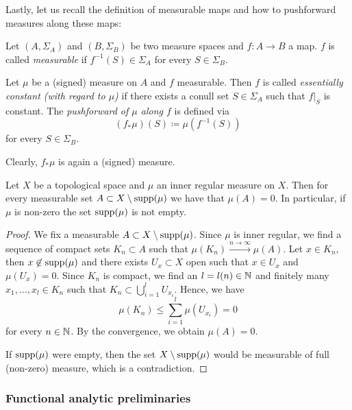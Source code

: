 Lastly, let us recall the definition of measurable maps and how to pushforward measures along these maps:

\begin{defin}
  \label{defin:pushforward}
  Let \((A, \Sigma_A)\) and \((B, \Sigma_B)\) be two measure spaces and \(f\colon A \to B\) a map. \(f\) is called \emph{measurable} if \(f^{-1}(S) \in \Sigma_A\) for every \(S \in \Sigma_B\).

  Let \(\mu\) be a (signed) measure on \(A\) and \(f\) measurable. Then \(f\) is called \emph{essentially constant (with regard to \(\mu\))} if there exists a conull set \(S \in \Sigma_A\) such that \(f|_S\) is constant. The \emph{pushforward of \(\mu\) along \(f\)} is defined via
  \[
    (f_\ast \mu)(S) \coloneqq \mu(f^{-1}(S))
  \]
  for every \(S \in \Sigma_B\).
\end{defin}

\begin{rem}
  Clearly, \(f_\ast\mu\) is again a (signed) measure.
\end{rem}

\begin{lemma}
  \label{lem:mu-supp}
  Let \(X\) be a topological space and \(\mu\) an inner regular measure on \(X\). Then for every measurable set \(A \subset X \setminus \operatorname{supp}(\mu)\) we have that \(\mu(A) = 0\). In particular, if \(\mu\) is non-zero the set \(\operatorname{supp}(\mu)\) is not empty.
\end{lemma}

\begin{proof}
  We fix a measurable \(A \subset X \setminus \operatorname{supp}(\mu)\). Since \(\mu\) is inner regular, we find a sequence of compact sets \(K_n \subset A\) such that \(\mu(K_n) \xrightarrow{n \to \infty} \mu(A)\). Let \(x \in K_n\), then \(x \not \in \operatorname{supp}(\mu)\) and there exists \(U_x \subset X\) open such that \(x \in U_x\) and \(\mu(U_x) = 0\). Since \(K_n\) is compact, we find an \(l = l(n) \in \mathbb{N}\) and finitely many \(x_1, \dots, x_l \in K_n\) such that \(K_n \subset \bigcup_{i=1}^l U_{x_i}\). Hence, we have
  \[
    \mu(K_n) \leq \sum_{i=1}^l \mu(U_{x_i}) = 0
  \]
  for every \(n \in \mathbb{N}\). By the convergence, we obtain \(\mu(A) = 0\).

  If \(\operatorname{supp}(\mu)\) were empty, then the set \(X \setminus \operatorname{supp}(\mu)\) would be measurable of full (non-zero) measure, which is a contradiction.
\end{proof}

\subsubsection*{Functional analytic preliminaries}
\label{sec:func-ana}

